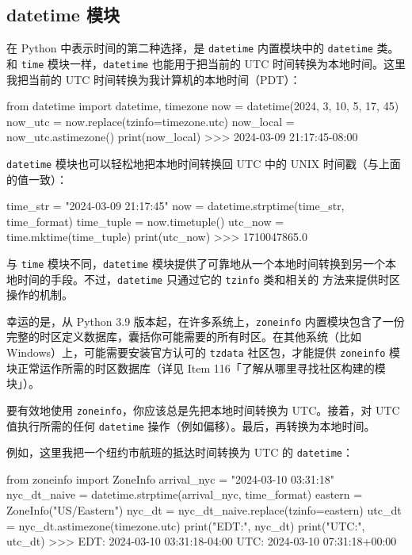 \subsection{datetime 模块}

在 Python 中表示时间的第二种选择，是 \texttt{datetime} 内置模块中的 \texttt{datetime} 类。和 \texttt{time} 模块一样，\texttt{datetime} 也能用于把当前的 UTC 时间转换为本地时间。这里我把当前的 UTC 时间转换为我计算机的本地时间（PDT）：

\begin{codebox}[python]
from datetime import datetime, timezone
now = datetime(2024, 3, 10, 5, 17, 45)
now_utc = now.replace(tzinfo=timezone.utc)
now_local = now_utc.astimezone()
print(now_local)
>>>
2024-03-09 21:17:45-08:00
\end{codebox}

\texttt{datetime} 模块也可以轻松地把本地时间转换回 UTC 中的 UNIX 时间戳（与上面的值一致）：

\begin{codebox}[python]
time_str = "2024-03-09 21:17:45"
now = datetime.strptime(time_str, time_format)
time_tuple = now.timetuple()
utc_now = time.mktime(time_tuple)
print(utc_now)
>>>
1710047865.0
\end{codebox}

与 \texttt{time} 模块不同，\texttt{datetime} 模块提供了可靠地从一个本地时间转换到另一个本地时间的手段。不过，\texttt{datetime} 只通过它的 \texttt{tzinfo} 类和相关的 方法来提供时区操作的机制。

幸运的是，从 Python 3.9 版本起，在许多系统上，\texttt{zoneinfo} 内置模块包含了一份完整的时区定义数据库，囊括你可能需要的所有时区。在其他系统（比如 Windows）上，可能需要安装官方认可的 \texttt{tzdata} 社区包，才能提供 \texttt{zoneinfo} 模块正常运作所需的时区数据库（详见 Item 116「了解从哪里寻找社区构建的模块」）。

要有效地使用 \texttt{zoneinfo}，你应该总是先把本地时间转换为 UTC。接着，对 UTC 值执行所需的任何 \texttt{datetime} 操作（例如偏移）。最后，再转换为本地时间。

例如，这里我把一个纽约市航班的抵达时间转换为 UTC 的 \texttt{datetime}：

\begin{codebox}[python]
from zoneinfo import ZoneInfo
arrival_nyc = "2024-03-10 03:31:18"
nyc_dt_naive = datetime.strptime(arrival_nyc, time_format)
eastern = ZoneInfo("US/Eastern")
nyc_dt = nyc_dt_naive.replace(tzinfo=eastern)
utc_dt = nyc_dt.astimezone(timezone.utc)
print("EDT:", nyc_dt)
print("UTC:", utc_dt)
>>>
EDT: 2024-03-10 03:31:18-04:00
UTC: 2024-03-10 07:31:18+00:00
\end{codebox}

